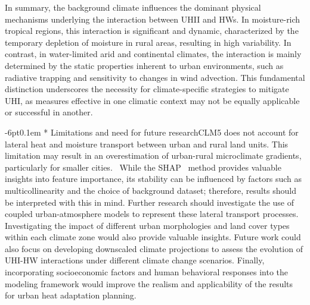 \documentclass[]{nature}
\makeatletter
\renewcommand{\subsection}{\@startsection {subsection}{2}{0pt}%
    {-6pt}{0.1em}%
    {\fontsize{12pt}{14pt}\selectfont\sffamily\bfseries}%
    }
\makeatother
\begin{document}
In summary, the background climate influences the dominant physical mechanisms underlying the interaction between UHII and HWs. In moisture-rich tropical regions, this interaction is significant and dynamic, characterized by the temporary depletion of moisture in rural areas, resulting in high variability. In contrast, in water-limited arid and continental climates, the interaction is mainly determined by the static properties inherent to urban environments, such as radiative trapping and sensitivity to changes in wind advection. This fundamental distinction underscores the necessity for climate-specific strategies to mitigate UHI, as measures effective in one climatic context may not be equally applicable or successful in another.



\subsection*{ \mbox{}\protect\newline  Limitations and need for future research}CLM5 does not account for lateral heat and moisture transport between urban and rural land units. This limitation may result in an overestimation of urban-rural microclimate gradients, particularly for smaller cities.\unskip~\cite{2755510:33598947}  While the SHAP\unskip~\cite{2755510:33598933} method provides valuable insights into feature importance, its stability can be influenced by factors such as multicollinearity and the choice of background dataset; therefore, results should be interpreted with this in mind. Further research should investigate the use of coupled urban-atmosphere models to represent these lateral transport processes. Investigating the impact of different urban morphologies and land cover types within each climate zone would also provide valuable insights. Future work could also focus on developing downscaled climate projections to assess the evolution of UHI-HW interactions under different climate change scenarios. Finally, incorporating socioeconomic factors and human behavioral responses into the modeling framework would improve the realism and applicability of the results for urban heat adaptation planning.
    
\end{document}
